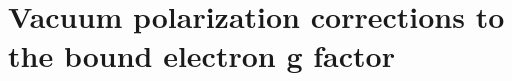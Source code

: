 \chapter{Vacuum polarization corrections to the bound electron g factor}
\label{ch:muongfac}
 







